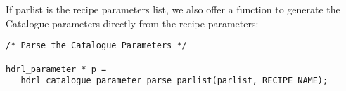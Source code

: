 If parlist is the recipe parameters list, we also offer a function to 
generate the Catalogue parameters directly from the recipe parameters:

\begin{lstlisting}
/* Parse the Catalogue Parameters */

hdrl_parameter * p = 
   hdrl_catalogue_parameter_parse_parlist(parlist, RECIPE_NAME);
 \end{lstlisting}
